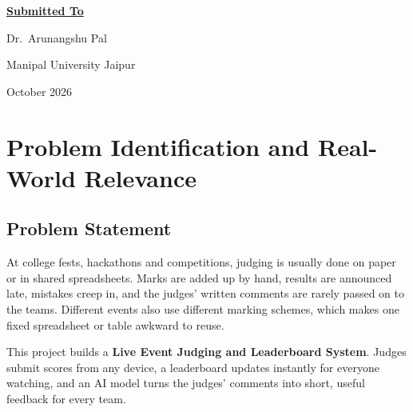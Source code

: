 \documentclass[11pt,a4paper]{article}
\begin{document}
\begin{titlepage}
\vspace{1.4cm}

{\large \underline{\textbf{Submitted To}}\par}
\vspace{0.3cm}
{\large Dr.\ Arunangshu Pal\par}

\vfill

{\large Manipal University Jaipur\par}
\vspace{4pt}
{\normalsize October 2026\par}

\end{titlepage}

\tableofcontents
\newpage

\section{Problem Identification and Real-World Relevance}

\subsection{Problem Statement}
At college fests, hackathons and competitions, judging is usually done on paper or in shared spreadsheets. Marks are added up by hand, results are announced late, mistakes creep in, and the judges' written comments are rarely passed on to the teams. Different events also use different marking schemes, which makes one fixed spreadsheet or table awkward to reuse.

This project builds a \textbf{Live Event Judging and Leaderboard System}. Judges submit scores from any device, a leaderboard updates instantly for everyone watching, and an AI model turns the judges' comments into short, useful feedback for every team.
\end{document}
